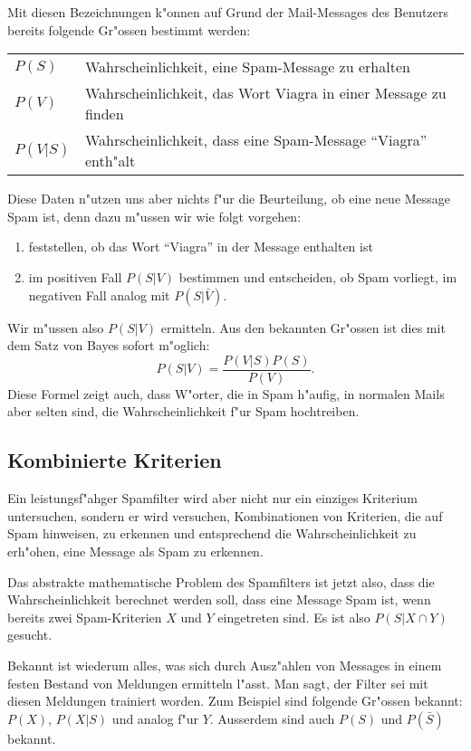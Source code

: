 Mit diesen Bezeichnungen k"onnen auf Grund der Mail-Messages des Benutzers
bereits folgende Gr"ossen bestimmt werden:
\begin{center}
\begin{tabular}{ll}
$P(S)$&Wahrscheinlichkeit, eine Spam-Message zu erhalten\\
$P(V)$&Wahrscheinlichkeit, das Wort Viagra in einer Message zu finden\\
$P(V|S)$&Wahrscheinlichkeit, dass eine Spam-Message ``Viagra'' enth"alt\\
\end{tabular}
\end{center}
Diese Daten n"utzen uns aber nichts f"ur die Beurteilung, ob eine neue
Message Spam ist, denn dazu m"ussen wir wie folgt vorgehen:
\begin{enumerate}
\item feststellen, ob das Wort ``Viagra'' in der Message enthalten ist
\item im positiven Fall $P(S|V)$ bestimmen und entscheiden, ob Spam vorliegt,
im negativen Fall analog mit $P(S|\bar V)$.
\end{enumerate}
Wir m"ussen also $P(S|V)$ ermitteln.
Aus den bekannten Gr"ossen ist dies
mit dem Satz von Bayes sofort m"oglich:
\begin{equation}
P(S|V)=\frac{P(V|S)P(S)}{P(V)}.
\end{equation}
Diese Formel zeigt auch, dass W"orter, die in Spam h"aufig, in normalen
Mails aber selten sind, die Wahrscheinlichkeit f"ur Spam hochtreiben.

\subsection{Kombinierte Kriterien}
Ein leistungsf"ahger Spamfilter wird aber nicht nur ein einziges Kriterium
untersuchen, sondern er wird versuchen, Kombinationen von Kriterien, die
auf Spam hinweisen, zu erkennen und entsprechend die Wahrscheinlichkeit
zu erh"ohen, eine Message als Spam zu erkennen.

Das abstrakte mathematische Problem des Spamfilters ist jetzt also,
dass die Wahrscheinlichkeit berechnet werden soll, dass eine Message
Spam ist, wenn bereits zwei Spam-Kriterien $X$ und $Y$ eingetreten
sind.
Es ist also $P(S|X\cap Y)$ gesucht.

Bekannt ist wiederum alles, was sich durch Ausz"ahlen von Messages
in einem festen Bestand von Meldungen ermitteln l"asst.
Man sagt, der Filter sei mit diesen Meldungen trainiert worden.
Zum Beispiel
sind folgende Gr"ossen bekannt: $P(X)$, $P(X|S)$ und analog f"ur $Y$.
Ausserdem sind auch $P(S)$ und $P(\bar S)$ bekannt.

